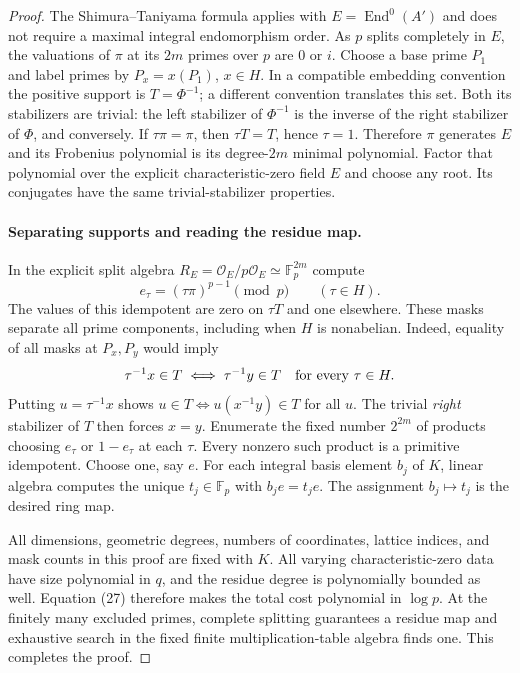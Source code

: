 \documentclass[11pt]{article}
\theoremstyle{definition}
\theoremstyle{remark}
\begin{document}
\begin{proof}
The Shimura--Taniyama formula
\cite[Section 5, p.~64, before Proposition 5.3]{Milne1999} applies with
$E=\operatorname{End}^0(A')$ and does not require a maximal integral
endomorphism order.  As $p$ splits completely in $E$, the valuations of
$\pi$ at its $2m$ primes over $p$ are $0$ or $i$.  Choose a base prime
$P_1$ and label primes by $P_x=x(P_1)$, $x\in H$.  In a compatible
embedding convention the positive support is $T=\Phi^{-1}$; a different
convention translates this set.  Both its stabilizers are trivial:
the left stabilizer of $\Phi^{-1}$ is the inverse of the right stabilizer
of $\Phi$, and conversely.  If $\tau\pi=\pi$, then $\tau T=T$, hence
$\tau=1$.  Therefore $\pi$ generates $E$ and its Frobenius polynomial is
its degree-$2m$ minimal polynomial.  Factor that polynomial over the explicit
characteristic-zero field $E$ and choose any root.  Its conjugates have the
same trivial-stabilizer properties.

\paragraph{Separating supports and reading the residue map.}
In the explicit split algebra
$R_E=\mathcal O_E/p\mathcal O_E\simeq\mathbb F_p^{2m}$ compute
\[
 e_\tau=(\tau\pi)^{p-1}\pmod p\qquad(\tau\in H).
\]
The values of this idempotent are zero on $\tau T$ and one elsewhere.
These masks separate all prime components, including when $H$ is
nonabelian.  Indeed, equality of all masks at $P_x,P_y$ would imply
\[
 \tau^{-1}x\in T\iff\tau^{-1}y\in T\quad\hbox{for every }\tau\in H.
\]
Putting $u=\tau^{-1}x$ shows
$u\in T\iff u(x^{-1}y)\in T$ for all $u$.  The trivial \emph{right}
stabilizer of $T$ then forces $x=y$.
Enumerate the fixed number $2^{2m}$ of products choosing $e_\tau$ or
$1-e_\tau$ at each $\tau$.  Every nonzero such product is a primitive
idempotent.  Choose one, say $e$.  For each integral basis element $b_j$ of
$K$, linear algebra computes the unique $t_j\in\mathbb F_p$ with
$b_je=t_je$.  The assignment $b_j\mapsto t_j$ is the desired ring map.

All dimensions, geometric degrees, numbers of coordinates, lattice indices,
and mask counts in this proof are fixed with $K$.  All varying
characteristic-zero data have size polynomial in $q$, and the residue
degree is polynomially bounded as well.  Equation (27) therefore makes the
total cost polynomial in $\log p$.  At the finitely many excluded primes,
complete splitting guarantees a residue map and exhaustive search in the
fixed finite multiplication-table algebra finds one.  This completes the
proof.
\end{proof}
\end{document}
